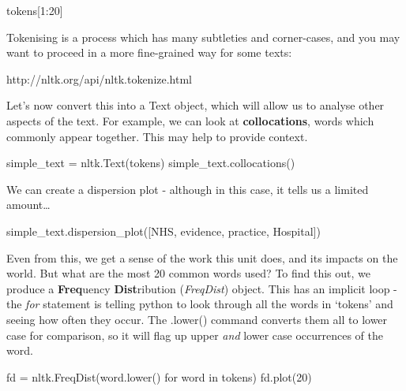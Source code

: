 \documentclass[
  letterpaper,
  DIV=11,
  numbers=noendperiod]{scrreprt}
\newenvironment{Shaded}{\begin{snugshade}}{\end{snugshade}}
\newcommand{\ControlFlowTok}[1]{\textcolor[rgb]{0.00,0.23,0.31}{#1}}
\newcommand{\DecValTok}[1]{\textcolor[rgb]{0.68,0.00,0.00}{#1}}
\newcommand{\KeywordTok}[1]{\textcolor[rgb]{0.00,0.23,0.31}{#1}}
\newcommand{\NormalTok}[1]{\textcolor[rgb]{0.00,0.23,0.31}{#1}}
\newcommand{\OperatorTok}[1]{\textcolor[rgb]{0.37,0.37,0.37}{#1}}
\newcommand{\StringTok}[1]{\textcolor[rgb]{0.13,0.47,0.30}{#1}}
\begin{document}
\begin{Shaded}
\begin{Highlighting}[]
\NormalTok{tokens[}\DecValTok{1}\NormalTok{:}\DecValTok{20}\NormalTok{]}
\end{Highlighting}
\end{Shaded}

Tokenising is a process which has many subtleties and corner-cases, and
you may want to proceed in a more fine-grained way for some texts:

http://nltk.org/api/nltk.tokenize.html

Let's now convert this into a Text object, which will allow us to
analyse other aspects of the text. For example, we can look at
\textbf{collocations}, words which commonly appear together. This may
help to provide context.

\begin{Shaded}
\begin{Highlighting}[]
\NormalTok{simple\_text }\OperatorTok{=}\NormalTok{ nltk.Text(tokens)}
\NormalTok{simple\_text.collocations()}
\end{Highlighting}
\end{Shaded}

We can create a dispersion plot - although in this case, it tells us a
limited amount\ldots{}

\begin{Shaded}
\begin{Highlighting}[]
\NormalTok{simple\_text.dispersion\_plot([}\StringTok{\textquotesingle{}NHS\textquotesingle{}}\NormalTok{, }\StringTok{\textquotesingle{}evidence\textquotesingle{}}\NormalTok{, }\StringTok{\textquotesingle{}practice\textquotesingle{}}\NormalTok{, }\StringTok{\textquotesingle{}Hospital\textquotesingle{}}\NormalTok{])}
\end{Highlighting}
\end{Shaded}

Even from this, we get a sense of the work this unit does, and its
impacts on the world. But what are the most 20 common words used? To
find this out, we produce a \textbf{Freq}uency \textbf{Dist}ribution
(\emph{FreqDist}) object. This has an implicit loop - the \emph{for}
statement is telling python to look through all the words in `tokens'
and seeing how often they occur. The .lower() command converts them all
to lower case for comparison, so it will flag up upper \emph{and} lower
case occurrences of the word.

\begin{Shaded}
\begin{Highlighting}[]
\NormalTok{fd }\OperatorTok{=}\NormalTok{ nltk.FreqDist(word.lower() }\ControlFlowTok{for}\NormalTok{ word }\KeywordTok{in}\NormalTok{ tokens)}
\NormalTok{fd.plot(}\DecValTok{20}\NormalTok{)}
\end{Highlighting}
\end{Shaded}
\end{document}
